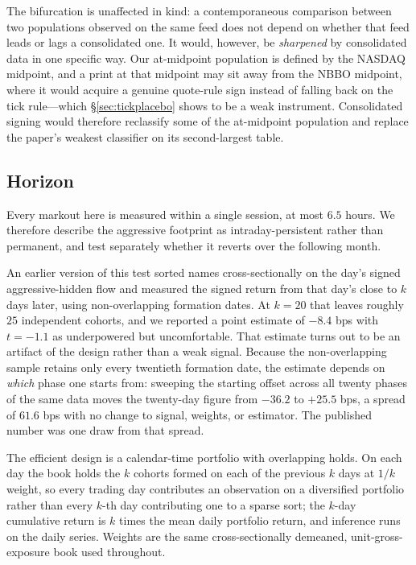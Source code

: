\documentclass[11pt]{article}
\begin{document}
The bifurcation is unaffected in kind: a contemporaneous comparison between two populations
observed on the same feed does not depend on whether that feed leads or lags a consolidated
one. It would, however, be \emph{sharpened} by consolidated data in one specific way. Our
at-midpoint population is defined by the NASDAQ midpoint, and a print at that midpoint may
sit away from the NBBO midpoint, where it would acquire a genuine quote-rule sign instead of
falling back on the tick rule---which \S\ref{sec:tickplacebo} shows to be a weak instrument.
Consolidated signing would therefore reclassify some of the at-midpoint population and
replace the paper's weakest classifier on its second-largest table.

\subsection{Horizon}

Every markout here is measured within a single session, at most $6.5$ hours. We therefore
describe the aggressive footprint as intraday-persistent rather than permanent, and test
separately whether it reverts over the following month.

An earlier version of this test sorted names cross-sectionally on the day's signed
aggressive-hidden flow and measured the signed return from that day's close to $k$ days
later, using non-overlapping formation dates. At $k=20$ that leaves roughly $25$ independent
cohorts, and we reported a point estimate of $-8.4$ bps with $t=-1.1$ as underpowered but
uncomfortable. That estimate turns out to be an artifact of the design rather than a weak
signal. Because the non-overlapping sample retains only every twentieth formation date, the
estimate depends on \emph{which} phase one starts from: sweeping the starting offset across
all twenty phases of the same data moves the twenty-day figure from $-36.2$ to $+25.5$ bps, a
spread of $61.6$ bps with no change to signal, weights, or estimator. The published number
was one draw from that spread.

The efficient design is a calendar-time portfolio with overlapping holds. On each day the
book holds the $k$ cohorts formed on each of the previous $k$ days at $1/k$ weight, so every
trading day contributes an observation on a diversified portfolio rather than every $k$-th
day contributing one to a sparse sort; the $k$-day cumulative return is $k$ times the mean
daily portfolio return, and inference runs on the daily series. Weights are the same
cross-sectionally demeaned, unit-gross-exposure book used throughout.
\end{document}
